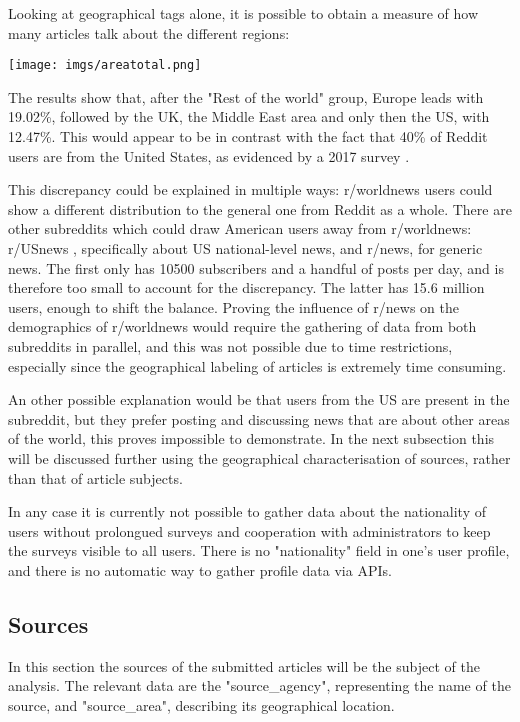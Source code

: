 \documentclass{article}
\begin{document}
Looking at geographical tags alone, it is possible to obtain a measure of how many articles talk about the different regions:

\bigskip

\texttt{[image: imgs/areatotal.png]}

\bigskip

The results show that, after the "Rest of the world" group, Europe leads with 19.02\%, followed by the UK, the Middle East area and only then the US, with 12.47\%. This would appear to be in contrast with the fact that 40\% of Reddit users are from the United States, as evidenced by a 2017 survey \cite{redditusercountry}. 

This discrepancy could be explained in multiple ways: r/worldnews users could show a different distribution to the general one from Reddit as a whole. There are other subreddits which could draw American users away from r/worldnews: r/USnews \cite{rusnews}, specifically about US national-level news, and r/news\cite{rnews}, for generic news. The first only has 10500 subscribers and a handful of posts per day, and is therefore too small to account for the discrepancy. The latter has 15.6 million users, enough to shift the balance. Proving the influence of r/news on the demographics of r/worldnews would require the gathering of data from both subreddits in parallel, and this was not possible due to time restrictions, especially since the geographical labeling of articles is extremely time consuming.

An other possible explanation would be that users from the US are present in the subreddit, but they prefer posting and discussing news that are about other areas of the world, this proves impossible to demonstrate. In the next subsection this will be discussed further using the geographical characterisation of sources, rather than that of article subjects.

In any case it is currently not possible to gather data about the nationality of users without prolongued surveys and cooperation with administrators to keep the surveys visible to all users. There is no "nationality" field in one's user profile, and there is no automatic way to gather profile data via APIs.

\pagebreak
\subsection{Sources}
In this section the sources of the submitted articles will be the subject of the analysis. The relevant data are the "source\_agency", representing the name of the source, and "source\_area", describing its geographical location.
\end{document}

